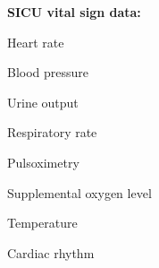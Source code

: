 \documentclass{sig-alternate}
\begin{document}
\noindent \textbf{SICU vital sign data:}
\begin{itemize*}
  \item Heart rate \vspace{3pt}
  \item Blood pressure \vspace{3pt}
  \item Urine output \vspace{3pt}
  \item Respiratory rate \vspace{3pt}
  \item Pulsoximetry \vspace{3pt}
  \item Supplemental oxygen level \vspace{3pt}
  \item Temperature \vspace{3pt}
  \item Cardiac rhythm \vspace{20pt}
\end{itemize*}
\end{document}
